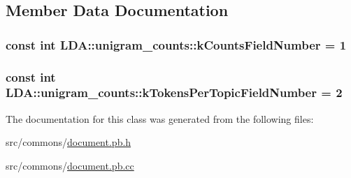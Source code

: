\subsection{Member Data Documentation}
\hypertarget{class_l_d_a_1_1unigram__counts_aaee872a5cd4d11184182da48eea41468}{
\subsubsection[{kCountsFieldNumber}]{\setlength{\rightskip}{0pt plus 5cm}const int {\bf LDA::unigram\_\-counts::kCountsFieldNumber} = 1}}
\label{class_l_d_a_1_1unigram__counts_aaee872a5cd4d11184182da48eea41468}
\hypertarget{class_l_d_a_1_1unigram__counts_a97d97f27b22d3f2816f5c16362dca298}{
\subsubsection[{kTokensPerTopicFieldNumber}]{\setlength{\rightskip}{0pt plus 5cm}const int {\bf LDA::unigram\_\-counts::kTokensPerTopicFieldNumber} = 2}}
\label{class_l_d_a_1_1unigram__counts_a97d97f27b22d3f2816f5c16362dca298}


The documentation for this class was generated from the following files:\begin{DoxyCompactItemize}
\item 
src/commons/\hyperlink{document_8pb_8h}{document.pb.h}\item 
src/commons/\hyperlink{document_8pb_8cc}{document.pb.cc}\end{DoxyCompactItemize}
